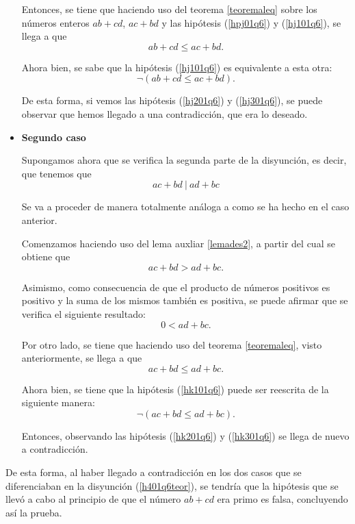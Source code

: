 \begin{demostracion}
\begin{itemize}
    Entonces, se tiene que haciendo uso del teorema \ref{teoremaleq}
    sobre los números enteros \(ab+cd\), \(ac+bd\) y las hipótesis
    (\ref{hpj01q6}) y (\ref{hj101q6}), se llega a que
    \begin{equation}\tag{hj2}\label{hj201q6}
      ab+cd≤ac+bd.
    \end{equation}

    Ahora bien, se sabe que la hipótesis (\ref{hj101q6}) es equivalente a
    esta otra:
    \begin{equation}\tag{hj3}\label{hj301q6}
      ¬(ab+cd≤ac+bd).
    \end{equation}

    De esta forma, si vemos las hipótesis (\ref{hj201q6}) y
    (\ref{hj301q6}), se puede observar que hemos llegado a una
    contradicción, que era lo deseado.

  \item \textbf{Segundo caso}

    Supongamos ahora que se verifica la segunda parte de la disyunción,
    es decir, que tenemos que
    \begin{equation}\tag{hk}\label{hk01q6teor}
      ac+bd\ |\ ad+bc
    \end{equation}

    Se va a proceder de manera totalmente análoga a como se ha hecho en
    el caso anterior.

    Comenzamos haciendo uso del lema auxliar \ref{lemades2}, a partir
    del cual se obtiene que
     \begin{equation}\tag{hk1}\label{hk101q6}
      ac+bd > ad+bc.
    \end{equation}

    Asimismo, como consecuencia de que el producto de números positivos
    es positivo y la suma de los mismos también es positiva, se puede
    afirmar que se verifica el siguiente resultado:
    \begin{equation}
      0<ad+bc.
    \end{equation}

    Por otro lado, se tiene que haciendo uso del teorema
    \ref{teoremaleq}, visto anteriormente, se llega a que
    \begin{equation}\tag{hk2}\label{hk201q6}
      ac+bd≤ad+bc.
    \end{equation}

    Ahora bien, se tiene que la hipótesis (\ref{hk101q6}) puede ser
    reescrita de la siguiente manera:
    \begin{equation}\tag{hk3}\label{hk301q6}
      ¬(ac+bd≤ad+bc).
    \end{equation}

    Entonces, observando las hipótesis (\ref{hk201q6}) y (\ref{hk301q6})
    se llega de nuevo a contradicción.
  \end{itemize}

  De esta forma, al haber llegado a contradicción en los dos casos que
  se diferenciaban en la disyunción (\ref{h401q6teor}), se tendría que
  la hipótesis que se llevó a cabo al principio de que el número
  \(ab+cd\) era primo es falsa, concluyendo así la prueba.
\end{demostracion}

